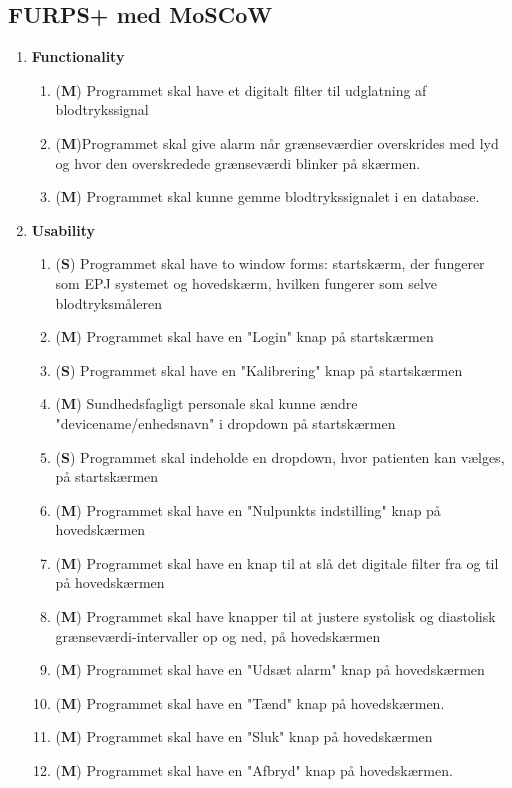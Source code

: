 \subsection{FURPS+ med MoSCoW}
\begin{enumerate}
\item \textbf{Functionality}
\begin{enumerate}
\item (\textbf{M}) Programmet skal have et digitalt filter til udglatning af blodtrykssignal
\item (\textbf{M})Programmet skal give alarm når grænseværdier overskrides med lyd og hvor den overskredede grænseværdi blinker på skærmen.
\item (\textbf{M}) Programmet skal kunne gemme blodtrykssignalet i en database.
\end{enumerate}
\item \textbf{Usability}
\begin{enumerate}
\item (\textbf{S}) Programmet skal have to window forms: startskærm, der fungerer som  EPJ systemet og hovedskærm, hvilken fungerer som selve blodtryksmåleren
\item (\textbf{M}) Programmet skal have en "Login" knap på startskærmen
\item (\textbf{S}) Programmet skal have en "Kalibrering" knap på startskærmen
\item (\textbf{M}) Sundhedsfagligt personale skal kunne ændre "devicename/enhedsnavn" i dropdown på startskærmen
\item (\textbf{S}) Programmet skal indeholde en dropdown, hvor patienten kan vælges, på startskærmen
\item (\textbf{M}) Programmet skal have en "Nulpunkts indstilling" knap på hovedskærmen
\item (\textbf{M}) Programmet skal have en knap til at slå det digitale filter fra og til på hovedskærmen
\item (\textbf{M}) Programmet skal have knapper til at justere systolisk og diastolisk grænseværdi-intervaller op og ned, på hovedskærmen
\item (\textbf{M}) Programmet skal have en "Udsæt alarm" knap på hovedskærmen
\item (\textbf{M}) Programmet skal have en "Tænd" knap på hovedskærmen.
\item (\textbf{M}) Programmet skal have en "Sluk" knap på hovedskærmen
\item (\textbf{M}) Programmet skal have en "Afbryd" knap på hovedskærmen.

\end{enumerate}
\end{enumerate}

